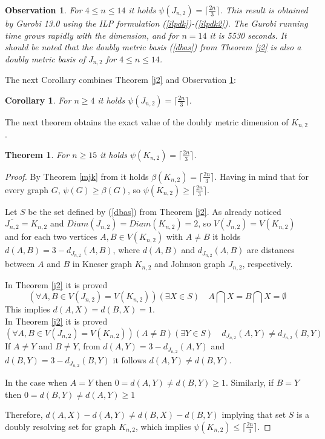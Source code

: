 \documentclass[preprint,12pt]{elsarticle}
\newtheorem{obs}{Observation}
\newtheorem{thm}{Theorem}
\newtheorem{cor}{Corollary}
\begin{document}
\begin{obs} \label{j2o} For $4 \le n \le 14$ it holds  $\psi(J_{n,2}) = \lceil \frac{2n}{3} \rceil$.
This result is obtained by Gurobi 13.0 using the ILP formulation (\ref{ilpdk})-(\ref{ilpdk2}).
The Gurobi running time grows rapidly with the dimension,
and for $n=14$ it is 5530 seconds. It should be noted that the doubly metric basis (\ref{dbas})
from Theorem \ref{j2} is also a doubly metric basis of $J_{n,2}$ for $4 \le n \le 14$.
\end{obs}
 

The next Corollary combines Theorem \ref{j2} and Observation \ref{j2o}:  

\begin{cor} \label{j2b} For $n \ge 4$ it holds  $\psi(J_{n,2}) = \lceil \frac{2n}{3} \rceil$.
\end{cor}


The next theorem obtains the exact value of the doubly metric dimension of $K_{n,2}$.

\begin{thm} \label{k2} For $n \ge 15$ it holds  $\psi(K_{n,2}) = \lceil \frac{2n}{3} \rceil$.
\end{thm}
\begin{proof} By Theorem \ref{mjk} from \cite{metdj1} it holds $\beta(K_{n,2}) = \lceil \frac{2n}{3} \rceil$.
Having in mind that for every graph $G$, $\psi(G) \ge \beta(G)$, so $\psi(K_{n,2}) \ge \lceil \frac{2n}{3} \rceil$.

Let $S$ be the set defined by (\ref{dbas}) from Theorem \ref{j2}.
As already noticed $\overline{J_{n,2}} = K_{n,2}$ and $Diam(J_{n,2}) = Diam(K_{n,2}) = 2$, so $V(J_{n,2}) = V(K_{n,2})$
and for each two vertices $A,B \in V(K_{n,2})$ with $A \ne B$ it holds $d(A,B) = 3 - d_{J_{n,2}}(A,B)$,
where $d(A,B)$ and  $d_{J_{n,2}}(A,B)$ are distances between $A$ and $B$ in Kneser graph $K_{n,2}$ and
Johnson graph $J_{n,2}$, respectively. 

In Theorem \ref{j2} it is proved $$(\forall A,B \in V(J_{n,2}) = V(K_{n,2})) (\exists X \in S) \quad A \bigcap X = B \bigcap X = \emptyset$$
This implies $d(A,X)=d(B,X)=1$.\\
In Theorem \ref{j2} it is proved $$(\forall A,B \in V(J_{n,2}) = V(K_{n,2}))(A \ne B) (\exists Y \in S) \quad d_{J_{n,2}}(A,Y) \ne d_{J_{n,2}}(B,Y)$$
If $A \ne Y$ and $B \ne Y$, from $d(A,Y) = 3 - d_{J_{n,2}}(A,Y)$ and $d(B,Y) = 3 - d_{J_{n,2}}(B,Y)$ it follows $d(A,Y) \ne d(B,Y)$.

In the case when $A = Y$ then $0 = d(A,Y) \ne d(B,Y) \ge 1$. Similarly, if $B = Y$ then $0 = d(B,Y) \ne d(A,Y) \ge 1$

Therefore, $d(A,X)-d(A,Y) \ne d(B,X)-d(B,Y)$ implying that set $S$ is a doubly resolving set for graph $K_{n,2}$, which implies $\psi(K_{n,2}) \le \lceil \frac{2n}{3} \rceil$.  
\end{proof}
\end{document}
